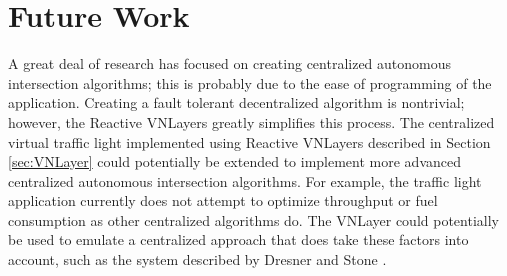 \documentclass[12pt]{article}
\begin{document}
\section{Future Work}
\label{sec:futureWork}
A great deal of research has focused on creating centralized autonomous intersection algorithms; this is probably due to the ease of programming of the application.  Creating a fault tolerant decentralized algorithm is nontrivial;  however, the Reactive VNLayers greatly simplifies this process.  The  centralized virtual traffic light implemented using Reactive VNLayers described in Section \ref{sec:VNLayer} could potentially be extended to implement more advanced centralized autonomous intersection algorithms.  For example, the traffic light application currently does not attempt to optimize throughput or fuel consumption as other centralized algorithms do.  The VNLayer could potentially be used to emulate a centralized approach that does take these factors into account, such as the system described by Dresner and Stone \cite{dresner}.

\end{document}
